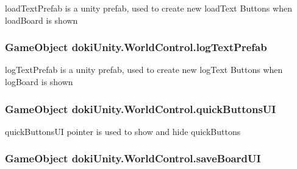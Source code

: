 load\+Text\+Prefab is a unity prefab, used to create new load\+Text Buttons when load\+Board is shown 

\subsubsection[{\texorpdfstring{log\+Text\+Prefab}{logTextPrefab}}]{\setlength{\rightskip}{0pt plus 5cm}Game\+Object doki\+Unity.\+World\+Control.\+log\+Text\+Prefab}\hypertarget{classdoki_unity_1_1_world_control_a181a566112a87ee1d59a57120f50191c}{}\label{classdoki_unity_1_1_world_control_a181a566112a87ee1d59a57120f50191c}


log\+Text\+Prefab is a unity prefab, used to create new log\+Text Buttons when log\+Board is shown 

\subsubsection[{\texorpdfstring{quick\+Buttons\+UI}{quickButtonsUI}}]{\setlength{\rightskip}{0pt plus 5cm}Game\+Object doki\+Unity.\+World\+Control.\+quick\+Buttons\+UI}\hypertarget{classdoki_unity_1_1_world_control_a75860dbad7622880a7423f9591c100eb}{}\label{classdoki_unity_1_1_world_control_a75860dbad7622880a7423f9591c100eb}


quick\+Buttons\+UI pointer is used to show and hide quick\+Buttons 

\subsubsection[{\texorpdfstring{save\+Board\+UI}{saveBoardUI}}]{\setlength{\rightskip}{0pt plus 5cm}Game\+Object doki\+Unity.\+World\+Control.\+save\+Board\+UI}\hypertarget{classdoki_unity_1_1_world_control_aa1f447bae428cf45ad3aa78221fc9af2}{}\label{classdoki_unity_1_1_world_control_aa1f447bae428cf45ad3aa78221fc9af2}


